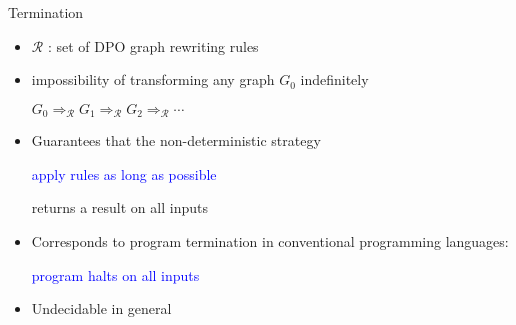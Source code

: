 \documentclass{beamer}
\begin{document}
\begin{frame}{Termination~\cite{plump2018modular}}
  \begin{itemize}
    \item $\mathcal{R}$ : set of DPO graph rewriting rules
    \item impossibility of transforming any graph $G_0$ indefinitely
      \begin{center}
        $G_0 \Rightarrow_\mathcal{R} G_1 \Rightarrow_\mathcal{R} G_2 \Rightarrow_\mathcal{R} \cdots$
      \end{center}
    \item Guarantees that the non-deterministic strategy
          \begin{center}
              \textcolor{blue}{apply rules as long as possible}
          \end{center}
          returns a result on all inputs
    \item Corresponds to program termination in conventional programming languages:
          \begin{center}
            \textcolor{blue}{program halts on all inputs}
          \end{center}
    \item Undecidable in general
  \end{itemize}
\end{frame}
\end{document}
